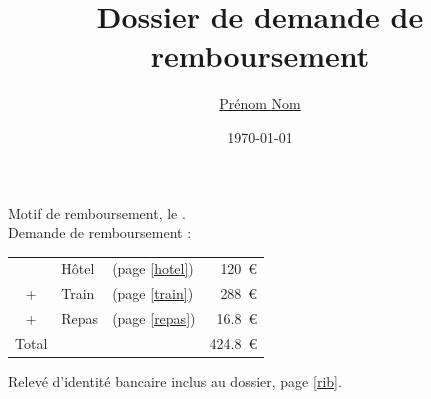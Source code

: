 \documentclass{article}
\date{\today}
\title{Dossier de demande de remboursement}
\author{\href{mailto:prenom.nom@mail.fr}{Prénom Nom}}
\newcounter{includepdfpage}
\newcommand\remboursementMotif{Motif de remboursement}
\begin{document}
\centerline{\huge \noindent \thetitle}

\vspace{3mm}
{\Large \noindent \theauthor}

\vspace{8mm}

\noindent
{\remboursementMotif, le .}\\

\noindent
Demande de remboursement :
\begin{table}[ht]
   \centering
   \begin{tabular}{cllr}
      & Hôtel & (page \ref{hotel}) & \SI{120}{\euro} \\
      + & Train & (page \ref{train}) & \SI{288}{\euro} \\
      + & Repas & (page \ref{repas}) & \SI{16.8}{\euro} \\
      \midrule
      Total & & & \SI{424.8}{\euro} \\
   \end{tabular}
\end{table}

\noindent
Relevé d'identité bancaire inclus au dossier, page \ref{rib}.

\phantom{\addtocounter{includepdfpage}{1}\theincludepdfpage}

\newpage


\newpage


\newpage


\newpage

\end{document}
